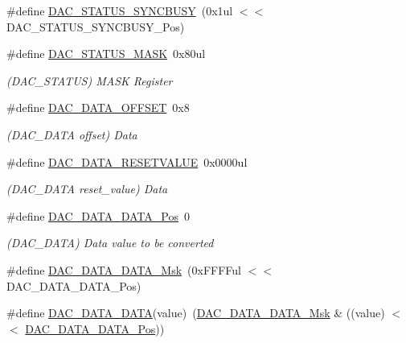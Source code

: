 \begin{DoxyCompactItemize}
\#define \mbox{\hyperlink{group___s_a_m_d21___d_a_c_gae923484ada5a9546eeb9dc1ccf30b0b8}{D\+A\+C\+\_\+\+S\+T\+A\+T\+U\+S\+\_\+\+S\+Y\+N\+C\+B\+U\+SY}}~(0x1ul $<$$<$ D\+A\+C\+\_\+\+S\+T\+A\+T\+U\+S\+\_\+\+S\+Y\+N\+C\+B\+U\+S\+Y\+\_\+\+Pos)
\item 
\#define \mbox{\hyperlink{group___s_a_m_d21___d_a_c_ga989b67a3f83996021dc0214e918aaddf}{D\+A\+C\+\_\+\+S\+T\+A\+T\+U\+S\+\_\+\+M\+A\+SK}}~0x80ul
\begin{DoxyCompactList}\small\item\em (D\+A\+C\+\_\+\+S\+T\+A\+T\+US) M\+A\+SK Register \end{DoxyCompactList}\item 
\#define \mbox{\hyperlink{group___s_a_m_d21___d_a_c_ga927b65fb825b37f7f7b23d90604430be}{D\+A\+C\+\_\+\+D\+A\+T\+A\+\_\+\+O\+F\+F\+S\+ET}}~0x8
\begin{DoxyCompactList}\small\item\em (D\+A\+C\+\_\+\+D\+A\+TA offset) Data \end{DoxyCompactList}\item 
\#define \mbox{\hyperlink{group___s_a_m_d21___d_a_c_ga18ce37ed9fbd7ceef65e3837f2ed73ec}{D\+A\+C\+\_\+\+D\+A\+T\+A\+\_\+\+R\+E\+S\+E\+T\+V\+A\+L\+UE}}~0x0000ul
\begin{DoxyCompactList}\small\item\em (D\+A\+C\+\_\+\+D\+A\+TA reset\+\_\+value) Data \end{DoxyCompactList}\item 
\#define \mbox{\hyperlink{group___s_a_m_d21___d_a_c_gabb4ad33edb03cfa83cacba4fbfcae055}{D\+A\+C\+\_\+\+D\+A\+T\+A\+\_\+\+D\+A\+T\+A\+\_\+\+Pos}}~0
\begin{DoxyCompactList}\small\item\em (D\+A\+C\+\_\+\+D\+A\+TA) Data value to be converted \end{DoxyCompactList}\item 
\#define \mbox{\hyperlink{group___s_a_m_d21___d_a_c_ga171d99dfcf0786683343dee659c78c1f}{D\+A\+C\+\_\+\+D\+A\+T\+A\+\_\+\+D\+A\+T\+A\+\_\+\+Msk}}~(0x\+F\+F\+F\+Ful $<$$<$ D\+A\+C\+\_\+\+D\+A\+T\+A\+\_\+\+D\+A\+T\+A\+\_\+\+Pos)
\item 
\#define \mbox{\hyperlink{group___s_a_m_d21___d_a_c_ga74d499bb7e6618526f4e7928cc871593}{D\+A\+C\+\_\+\+D\+A\+T\+A\+\_\+\+D\+A\+TA}}(value)~(\mbox{\hyperlink{group___s_a_m_d21___d_a_c_ga171d99dfcf0786683343dee659c78c1f}{D\+A\+C\+\_\+\+D\+A\+T\+A\+\_\+\+D\+A\+T\+A\+\_\+\+Msk}} \& ((value) $<$$<$ \mbox{\hyperlink{group___s_a_m_d21___d_a_c_gabb4ad33edb03cfa83cacba4fbfcae055}{D\+A\+C\+\_\+\+D\+A\+T\+A\+\_\+\+D\+A\+T\+A\+\_\+\+Pos}}))
$$
\end{DoxyCompactItemize}
